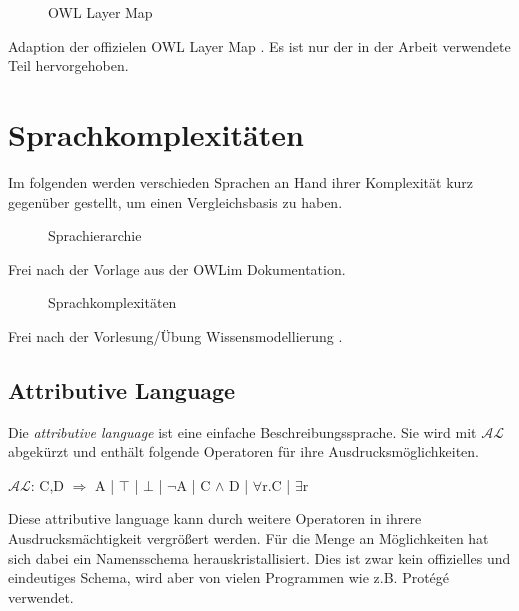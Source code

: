 \begin{figure}
	\caption{OWL Layer Map}
	\label{image-owl-layer-map}
\end{figure}
Adaption der offizielen OWL Layer Map \cite{OWLLayerMap}. Es ist nur der in der Arbeit verwendete Teil hervorgehoben.

\section{Sprachkomplexitäten}
Im folgenden werden verschieden Sprachen an Hand ihrer Komplexität kurz gegenüber gestellt, um einen Vergleichsbasis zu haben.


\begin{figure}
	\caption{Sprachierarchie \cite{OWLimManual}}
	\label{image-sprachhierarchie}
\end{figure}
Frei nach der Vorlage aus der OWLim Dokumentation.

\begin{figure}
	\caption{Sprachkomplexitäten}
	\label{image-sprachhierarchie}
\end{figure}
Frei nach der Vorlesung/Übung Wissensmodellierung \cite{WiMo}.

\subsection{Attributive Language}
Die \emph{attributive language} ist eine einfache Beschreibungssprache. Sie wird mit $\mathcal{AL}$ abgekürzt und enthält folgende Operatoren für ihre Ausdrucksmöglichkeiten.

$\mathcal{AL}$: C,D $\Longrightarrow$ A | $\top$ | $\bot$ | $\lnot$A | C $\land$ D | $\forall$r.C | $\exists$r

Diese attributive language kann durch weitere Operatoren in ihrere Ausdrucksmächtigkeit vergrößert werden. Für die Menge an Möglichkeiten hat sich dabei ein Namensschema herauskristallisiert. Dies ist zwar kein offizielles und eindeutiges Schema, wird aber von vielen Programmen wie z.B. Protégé verwendet.

